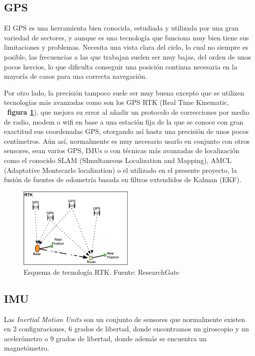 \subsection{GPS}

El GPS es una herramienta bien conocida, estudiada y utilizada por una gran variedad de sectores, y aunque es una tecnología que funciona 
muy bien tiene sus limitaciones y problemas. Necesita una vista clara del cielo, lo cual no siempre es posible, las frecuencias a las que trabajan 
suelen ser muy bajas, del orden de unos pocos hercios, lo que dificulta conseguir una posición continua necesaria en 
la mayoría de casos para una correcta navegación. 

Por otro lado, la precisión tampoco suele ser muy buena excepto que se utilizen tecnologías más avanzadas como son los 
GPS RTK (Real Time Kinematic, ~\textbf{figura \ref{fig:rtk_tech}}), que mejora su error al añadir un protocolo de correcciones por medio de radio, modem o wifi en base a una 
estación fija de la que se conoce con gran exactitud sus coordenadas GPS, otorgando así hasta una precisión de unos pocos centímetros. Aún así, 
normalmente es muy necesario usarlo en conjunto con otros sensores, sean varios GPS, IMUs o con técnicas más avanzadas de localización 
como el conocido SLAM (SImultaneous Localization and Mapping), AMCL (Adaptative Montecarlo localization) o el utilizado en el presente 
proyecto, la fusión de fuentes de odometría basada en filtros extendidos de Kalman (EKF).

\begin{figure}[h]
    \centering
    \includegraphics[width=0.5\textwidth]{images/rtk_arquitecture.png}
    \caption{Esquema de tecnología RTK. Fuente: ResearchGate}
    \label{fig:rtk_tech}
\end{figure}

\subsection{IMU}

Las \textit{Inertial Motion Units} son un conjunto de sensores que normalmente existen en 2 configuraciones, 6 grados de libertad, 
donde encontramos un giroscopio y un acelerómetro o 9 grados de libertad, donde además se encuentra un magnetómetro.

